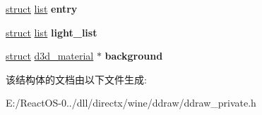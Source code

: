 \begin{DoxyCompactItemize}
\begin{tabbing}
\end{tabbing}\item 
\mbox{\label{structd3d__viewport_a4b48428982d67b24f3c91bc7a4835431}} 
\hyperlink{interfacestruct}{struct} \hyperlink{classlist}{list} {\bfseries entry}
\item 
\mbox{\label{structd3d__viewport_a02ba4a751c8544a7a110d16c1daba8ab}} 
\hyperlink{interfacestruct}{struct} \hyperlink{classlist}{list} {\bfseries light\+\_\+list}
\item 
\mbox{\label{structd3d__viewport_a443773774687f5cc80df39e2b0afe5ef}} 
\hyperlink{interfacestruct}{struct} \hyperlink{structd3d__material}{d3d\+\_\+material} $\ast$ {\bfseries background}
\end{DoxyCompactItemize}


该结构体的文档由以下文件生成\+:\begin{DoxyCompactItemize}
\item 
E\+:/\+React\+O\+S-\/0../dll/directx/wine/ddraw/ddraw\+\_\+private.\+h\end{DoxyCompactItemize}
